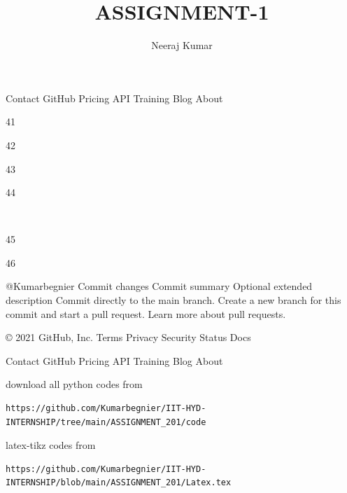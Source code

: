 \documentclass[journal,12pt,twocolumn]{IEEEtran}
\DeclareMathOperator*{\Res}{Res}
\renewcommand\thesection{\arabic{section}}
\renewcommand\thesubsection{\thesection.\arabic{subsection}}
\begin{document}
    Contact GitHub
    Pricing
    API
    Training
    Blog
    About



    \usepackage{lscape}     

41

\usepackage{multicol}

42

\usepackage{chngcntr}

43

\DeclareMathOperator*{\Res}{Res}

44

​

45

\renewcommand\thesection{\arabic{section}}

46

\renewcommand\thesubsection{\thesection.\arabic{subsection}}

@Kumarbegnier
Commit changes
Commit summary
Optional extended description
Commit directly to the main branch.
Create a new branch for this commit and start a pull request. Learn more about pull requests.

    © 2021 GitHub, Inc.
    Terms
    Privacy
    Security
    Status
    Docs

    Contact GitHub
    Pricing
    API
    Training
    Blog
    About


\newcommand{\cosec}{\,\text{cosec}\,}
\providecommand{\dec}[2]{\ensuremath{\overset{#1}{\underset{#2}{\gtrless}}}}
\newcommand{\myvec}[1]{\ensuremath{\begin{pmatrix}#1\end{pmatrix}}}
\newcommand{\mydet}[1]{\ensuremath{\begin{vmatrix}#1\end{vmatrix}}}
\makeatletter
{}
\makeatother
\let\StandardTheFigure\thefigure
\let\vec\mathbf
\renewcommand{\thefigure}{\theproblem}
\def\putbox#1#2#3{\makebox[0in][l]{\makebox[#1][l]{}\raisebox{\baselineskip}[0in][0in]{\raisebox{#2}[0in][0in]{#3}}}}
     \def\rightbox#1{\makebox[0in][r]{#1}}
     \def\centbox#1{\makebox[0in]{#1}}
     \def\topbox#1{\raisebox{-\baselineskip}[0in][0in]{#1}}
     \def\midbox#1{\raisebox{-0.5\baselineskip}[0in][0in]{#1}}
\vspace{3cm}
\title{ASSIGNMENT-1}
\author{Neeraj Kumar}
\maketitle
\newpage
\bigskip
\renewcommand{\thefigure}{\theenumi}
\renewcommand{\thetable}{\theenumi}
%
download all python codes from 
%
\begin{lstlisting}
https://github.com/Kumarbegnier/IIT-HYD-INTERNSHIP/tree/main/ASSIGNMENT_201/code
\end{lstlisting}
%
latex-tikz codes from
%
\begin{lstlisting}
https://github.com/Kumarbegnier/IIT-HYD-INTERNSHIP/blob/main/ASSIGNMENT_201/Latex.tex
\end{lstlisting}
%
\end{document}
